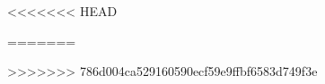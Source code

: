 \pagebreak

\thispagestyle{empty}
<<<<<<< HEAD


\addtolength{\wpXoffset}{-4.5cm}
=======

\addtolength{\wpXoffset}{-16.5cm}
>>>>>>> 786d004ca529160590ecf59e9ffbf6583d749f3e

\justify

%







